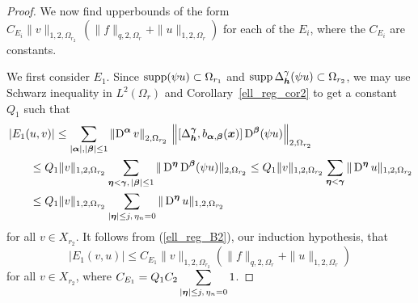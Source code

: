 \begin{proof}
We now find upperbounds of the form
$\displaystyle C_{E_i} \|v\|_{1,2,\Omega_{r_2}}\, \left( \|f\|_{q,2,\Omega_r}
+ \|u\|_{1,2,\Omega_r} \right)$ for each of the $E_i$, where the $C_{E_i}$
are constants.

We first consider $E_1$.  Since $\operatorname{supp} (\psi u) \subset \Omega_{r_1}$
and $\displaystyle \operatorname{supp} \Delta_{{\bm{h}}}^\gamma (\psi u) \subset \Omega_{r_2}$,
we may use Schwarz inequality in $\displaystyle L^2(\Omega_r)$ and
Corollary~\ref{ell_reg_cor2} to get a constant $Q_1$ such that
\begin{align*}
&\left| E_1(u,v) \right| \leq 
\sum_{|{\bm{\alpha}}|,|{\bm{\beta}}|\leq 1}
\left\| \operatorname{D}^{{\bm{\alpha}}} v\right\|_{2,\Omega_{r_2}} \,
\left\|[\Delta_{{\bm{h}}}^{{\bm{\gamma}}},
b_{{\bm{\alpha}},{\bm{\beta}}}({\bm{x}})] \operatorname{D}^{{\bm{\beta}}} (\psi u)
\right\|_{2,\Omega_{r_2}} \\
&\qquad \leq Q_1 \|v\|_{1,2,\Omega_{r_2}}
\sum_{{\bm{\eta}}<{\bm{\gamma}},\, |{\bm{\beta}}|\leq 1}
\| \operatorname{D}^{{\bm{\eta}}} \operatorname{D}^{{\bm{\beta}}} (\psi u) \|_{2,\Omega_{r_2}}
\leq Q_1 \|v\|_{1,2,\Omega_{r_2}}
\sum_{{\bm{\eta}}<{\bm{\gamma}}} \| \operatorname{D}^{{\bm{\eta}}} u \|_{1,2,\Omega_{r_2}} \\
&\qquad \leq Q_1 \|v\|_{1,2,\Omega_{r_2}}
\sum_{|{\bm{\eta}}|\leq j,\, \eta_n=0} \| \operatorname{D}^{{\bm{\eta}}} u \|_{1,2,\Omega_{r_2}}
\end{align*}
for all $v \in X_{r_2}$.  It follows from (\ref{ell_reg_B2}), our
induction hypothesis, that
\[
\left| E_1(v,u) \right| \leq C_{E_1} \|v\|_{1,2,\Omega_{r_2}}
\left( \|f\|_{q,2,\Omega_r} + \|u\|_{1,2,\Omega_r} \right)
\]
for all $v \in X_{r_2}$, where
$\displaystyle C_{E_1} = Q_1 C_2 \sum_{|{\bm{\eta}}|\leq j,\,\eta_n=0} 1$.


\end{proof}
